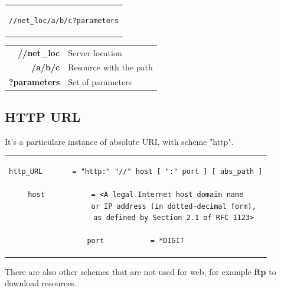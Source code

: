 \begin{center}
\begin{tabular}{c}
\begin{lstlisting}[linewidth=320pt, basicstyle=\footnotesize\sffamily,]
//net_loc/a/b/c?parameters
\end{lstlisting}
\end{tabular}
\end{center}
\begin{table}[h]
\centering \footnotesize
\begin{tabular}{rl}
\textbf{//net\_loc}&{Server location}\\
\textbf{/a/b/c}&{Resource with the path}\\
\textbf{?parameters}&{Set of parameters}
\end{tabular}
\end{table}

\subsection{HTTP URL}
It's a particulare instance of absolute URI, with scheme "http".
\begin{center}
\begin{tabular}{c}
\begin{lstlisting}[linewidth=320pt, basicstyle=\footnotesize\sffamily,]
http_URL       = "http:" "//" host [ ":" port ] [ abs_path ]

host           = <A legal Internet host domain name
                  or IP address (in dotted-decimal form),
                  as defined by Section 2.1 of RFC 1123>

port           = *DIGIT
\end{lstlisting}
\end{tabular}
\end{center}
There are also other schemes that are not used for web, for example \textbf{ftp} to download resources.

